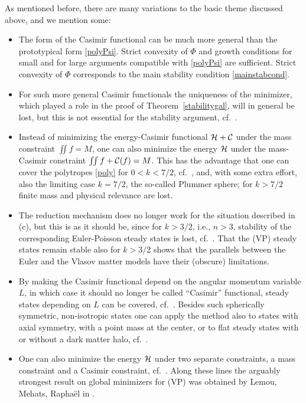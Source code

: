 \documentclass[11pt]{article}
\begin{document}
As mentioned before, there are many variations to the basic theme discussed
above, and we mention some:
%
\begin{remark}
  \begin{itemize}
  \item[(a)]
    The form of the Casimir functional can be much more general than
    the prototypical form \eqref{polyPsi}.
    Strict convexity of $\Phi$ and growth conditions for small and for large
    arguments compatible with \eqref{polyPsi} are sufficient.
    Strict convexity of $\Phi$ corresponds to the main stability condition
    \eqref{mainstabcond}.
  \item[(b)]
    For such more general Casimir functionals the uniqueness of the minimizer,
    which played a role in the proof of Theorem~\ref{stabilitygal},
    will in general be lost, but this is not essential for the
    stability argument, cf.~\cite{Sch3}.
  \item[(c)]
    Instead of minimizing the energy-Casimir functional ${\cal H} + {\cal C}$ under
    the mass constraint $\iint f = M$, one can also minimize the energy ${\cal H}$
    under the mass-Casimir constraint $\iint f + {\cal C}(f)=M$.
    This has the advantage that
    one can cover the polytropes \eqref{poly} for $0<k<7/2$,
    cf.~\cite{GuRe2001,Rein07}, and, with some extra effort, also the limiting
    case $k=7/2$, the so-called Plummer sphere;
    for $k>7/2$ finite mass and physical relevance are lost.
  \item[(d)]
    The reduction mechanism does no longer work for the situation
    described in (c), but this is as it should be,
    since for $k>3/2$, i.e., $n>3$, stability of the corresponding Euler-Poisson
    steady states is lost, cf.~\cite{Jang}. That the (VP) steady states remain
    stable also for $k>3/2$ shows that the parallels between the Euler and
    the Vlasov matter models have their (obscure) limitations.
  \item[(e)]
    By making the Casimir functional depend on the angular momentum
    variable $L$, in which case it should no longer be called
    ``Casimir'' functional, steady states
    depending on $L$ can be covered, cf.~\cite{Guo99,GuRe99,GuRe99b}.
    Besides such spherically symmetric, non-isotropic states one can apply
    the method also to states with axial symmetry, with a point mass at
    the center, or to flat steady states with or without a dark matter halo,
    cf.~\cite{Firt07,FiRe,FiReSe,GuRe03,Rein99a,Schulze_09}.
  \item[(f)]
    One can also minimize the energy ${\cal H}$ under two separate constraints, a mass
    constraint and a Casimir constraint, cf.~\cite{SS}. Along these lines
    the arguably strongest result on global minimizers for (VP) was obtained
    by {\sc Lemou, Mehats, Rapha\"el} in \cite{LeMeRa1}.
  \end{itemize}  
\end{remark}
%
\end{document}
